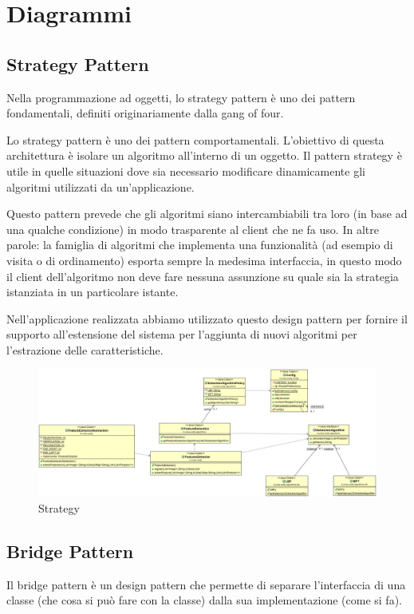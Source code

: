 \chapter{Diagrammi}

\section{Strategy Pattern}
Nella programmazione ad oggetti, lo strategy pattern è uno dei pattern fondamentali, definiti originariamente dalla gang of four.

Lo strategy pattern è uno dei pattern comportamentali. L'obiettivo di questa architettura è isolare un algoritmo all'interno di un oggetto. Il pattern strategy è utile in quelle situazioni dove sia necessario modificare dinamicamente gli algoritmi utilizzati da un'applicazione. 

Questo pattern prevede che gli algoritmi siano intercambiabili tra loro (in base ad una qualche condizione) in modo trasparente al client che ne fa uso. In altre parole: la famiglia di algoritmi che implementa una funzionalità (ad esempio di visita o di ordinamento) esporta sempre la medesima interfaccia, in questo modo il client dell'algoritmo non deve fare nessuna assunzione su quale sia la strategia istanziata in un particolare istante.

Nell'applicazione realizzata abbiamo utilizzato questo design pattern per fornire il supporto all'estensione del sistema per l'aggiunta di nuovi algoritmi per l'estrazione delle caratteristiche.

\begin{figure}[ht]
	\centering
	\includegraphics[width=1.5\textwidth, angle=90]{img/strategy.png}
	\caption{Strategy}\label{fig:strategy}
\end{figure}

\section{Bridge Pattern}
Il bridge pattern è un design pattern che permette di separare l'interfaccia di una classe (che cosa si può fare con la classe) dalla sua implementazione (come si fa).

